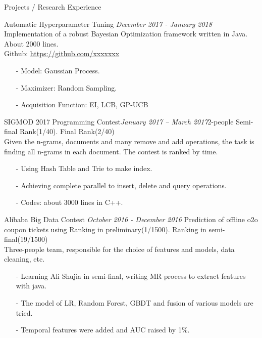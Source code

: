 \documentclass{resume} %
\begin{document}

\begin{rSection}{Projects / Research Experience}

\begin{rSubsection}{Automatic Hyperparameter Tuning} {\em December 2017 - January 2018}
{Implementation of a robust Bayesian Optimization framework written in Java. About 2000 lines.\\}
{Github: \rm \url{https://github.com/xxxxxxx}}
\item[]
\begin{itemize}
\setlength\itemsep{-0.5em}
\item[-] Model: Gaussian Process.
\item[-] Maximizer: Random Sampling.
\item[-] Acquisition Function: EI, LCB, GP-UCB
\end{itemize}
\end{rSubsection}

\begin{rSubsection}{SIGMOD 2017 Programming Contest}{\em January 2017 – March 2017}{2-people Semi-final Rank(1/40). Final Rank(2/40) \\}
{Given the n-grams, documents and many remove and add operations, the task is finding all n-grams in each
document. The contest is ranked by time.}
\item[]
\begin{itemize}
\setlength\itemsep{-0.5em}
\item[-] Using Hash Table and Trie to make index.
\item[-] Achieving complete parallel to insert, delete and query operations.
\item[-] Codes: about 3000 lines in C++.
\end{itemize}
\end{rSubsection}

\begin{rSubsection}{Alibaba Big Data Contest} {\em October 2016 - December 2016}
{Prediction of offline o2o coupon tickets using Ranking in preliminary(1/1500). Ranking in semi-final(19/1500) \\}
{Three-people team, responsible for the choice of features and models, data cleaning, etc.}
\item[]
\begin{itemize}
\setlength\itemsep{-0.5em}
\item[-] Learning Ali Shujia in semi-final, writing MR process to extract features with java.
\item[-] The model of LR, Random Forest, GBDT and fusion of various models are tried.
\item[-] Temporal features were added and AUC raised by 1\%.
\end{itemize}
\end{rSubsection}


\end{rSection}
\end{document}
